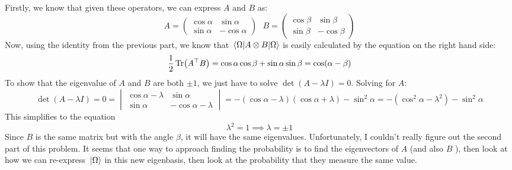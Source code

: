 \documentclass[10pt]{article}
\begin{document}
\begin{enumerate}[label=\alph*)]
			\begin{solution}
				Firstly, we know that given these operators, we can express \( A \) and \( B \) as: 
				\[
					A = \begin{pmatrix} \cos \alpha & \sin \alpha\\ \sin \alpha & -\cos \alpha \end{pmatrix} \ \ \ 
					B = \begin{pmatrix} \cos \beta & \sin \beta\\ \sin \beta & -\cos \beta \end{pmatrix} 
				\] 
				Now, using the identity from the previous part, we know that \( \mel{\Omega}{A \otimes B}{\Omega} \) 
				is easily calculated by the equation on the right hand side:  
				\[
				\frac{1}{2}\Tr(A^{\top}B) = \cos \alpha \cos \beta + \sin \alpha \sin \beta = \cos(\alpha - \beta)
				\] 
				To show that the eigenvalue of \( A \) and \( B \) are both \( \pm 1 \), we just have to solve 
				\( \det(A - \lambda I) = 0 \). Solving for \( A \):
				\[
					\det(A - \lambda I) = 0 =  \begin{vmatrix} \cos \alpha - \lambda & \sin \alpha \\
					\sin \alpha & -\cos \alpha - \lambda \end{vmatrix} = 
					-(\cos \alpha - \lambda)(\cos \alpha + \lambda) - \sin^2 \alpha = -(\cos^2 \alpha - \lambda ^2) 
					- \sin^2 \alpha
				\]
				This simplifies to the equation 
				\[
				\lambda^2 = 1 \implies \lambda = \pm 1
				\] 
				Since \( B \) is the same matrix but with the angle \( \beta \), it will have the same eigenvalues.
				Unfortunately, I couldn't really figure out the second part of this problem. It seems that one way 
				to approach finding the probability 
				is to find the eigenvectors of \( A \) (and also \( B \) ), then look at 
				how we can re-express \( \ket*{\Omega} \) in this new eigenbasis, then look at the probability 
				that they measure the same value.


\end{solution}
\end{enumerate}
\end{document}
